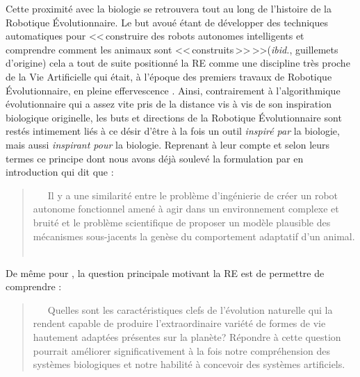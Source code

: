Cette proximité avec la biologie se retrouvera tout au long de l'histoire de la Robotique \'Evolutionnaire. Le but avoué étant de développer des techniques automatiques pour <<\,construire des robots autonomes intelligents et comprendre comment les animaux sont <<\,construits\,>>\,>>(\emph{ibid.}, guillemets d'origine) cela a tout de suite positionné la RE comme une discipline très proche de la Vie Artificielle qui était, à l'époque des premiers travaux de Robotique \'Evolutionnaire, en pleine effervescence \citep{langton89alifeiproceedingsfirstinternationalworkshopsynthesissimulationlivingsystems}. Ainsi, contrairement à l'algorithmique évolutionnaire qui a assez vite pris de la distance vis à vis de son inspiration biologique originelle, les buts et directions de la Robotique \'Evolutionnaire sont restés intimement liés à ce désir d'être à la fois un outil \emph{inspiré par} la biologie, mais aussi \emph{inspirant pour} la biologie. Reprenant à leur compte et selon leurs termes ce principe dont nous avons déjà soulevé la formulation par \cite{maynardsmith78optimizationtheoryinevolution} en introduction qui dit que :

\begin{quotation}

   Il y a une similarité entre le problème d'ingénierie de créer un robot autonome fonctionnel amené à agir dans un environnement complexe et bruité et le problème scientifique de proposer un modèle plausible des mécanismes sous-jacents la genèse du comportement adaptatif d'un animal.\\
   \citep[p. 74]{cliff93explorationsinevolutionaryrobotics}

\end{quotation}

De même pour \citet[p. 12-13]{nolfi00evolrobobiolintetechselfmach}, la question principale motivant la RE est de permettre de comprendre :

\begin{quotation}

   Quelles sont les caractéristiques clefs de l'évolution naturelle qui la rendent capable de produire l'extraordinaire variété de formes de vie hautement adaptées présentes sur la planète? Répondre à cette question pourrait améliorer significativement à la fois notre compréhension des systèmes biologiques et notre habilité à concevoir des systèmes artificiels.

\end{quotation}

